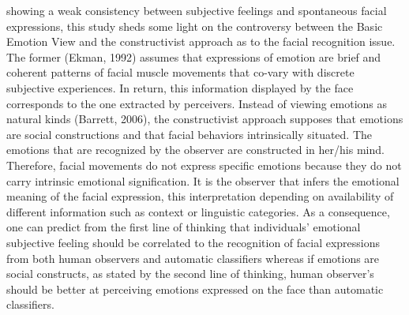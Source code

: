 \documentclass[man]{apa6}
\begin{document}
showing a weak consistency between subjective feelings and spontaneous facial expressions, this study sheds some light on the controversy between the Basic Emotion View and the constructivist approach as to the facial recognition issue. The former (Ekman, 1992) assumes that expressions of emotion are brief and coherent patterns of facial muscle movements that co-vary with discrete subjective experiences. In return, this information displayed by the face corresponds to the one extracted by perceivers. Instead of viewing emotions as natural kinds (Barrett, 2006), the constructivist approach supposes that emotions are social constructions and that facial behaviors intrinsically situated. The emotions that are recognized by the observer are constructed in her/his mind. Therefore, facial movements do not express specific emotions because they do not carry intrinsic emotional signification. It is the observer that infers the emotional meaning of the facial expression, this interpretation depending on availability of different information such as context or linguistic categories. As a consequence, one can predict from the first line of thinking that individuals' emotional subjective feeling should be correlated to the recognition of facial expressions from both human observers and automatic classifiers whereas if emotions are social constructs, as stated by the second line of thinking, human observer's should be better at perceiving emotions expressed on the face than automatic classifiers.
\end{document}
